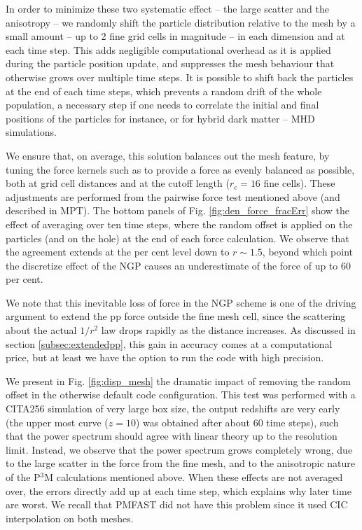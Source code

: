 \documentclass[useAMS,usenatbib]{mn2e}
\begin{document}
In order to minimize these two systematic effect -- the large scatter and the anisotropy -- 
we randomly shift the particle distribution relative to the mesh by a small
amount -- up to 2 fine grid cells in magnitude -- in each
dimension and at each time step.  This adds negligible computational
overhead as it is applied during the particle position update,
and suppresses the mesh behaviour that otherwise grows over multiple time steps.
It is possible to shift back the particles at the end of each time steps,
which prevents a random drift of the whole population, a necessary step 
if one needs to correlate the initial and final positions of the particles for instance,
or for hybrid dark matter -- MHD simulations.
 
We ensure that, on average, this solution balances out the mesh feature,
by tuning the force kernels such as to provide a force as evenly balanced as possible, both at grid cell distances
and at the cutoff length ($r_{c}=16$ fine cells).
These adjustments are performed from the pairwise force test mentioned above (and described in MPT).
The bottom panels of Fig. \ref{fig:den_force_fracErr} show the effect of averaging over ten time steps, 
where the random offset is applied on the particles (and on the hole) at the end of each force calculation. 
We observe that the agreement extends at the per cent level down to $r \sim 1.5$, beyond which point
the discretize effect of the NGP causes an underestimate of the force of up to 60 per cent.

We note that this inevitable loss of force in the NGP scheme is one of the driving argument to extend the pp force outside the fine mesh cell,
since the scattering about the actual $1/r^{2}$ law drops rapidly as the distance increases.
As discussed in section \ref{subsec:extendedpp}, this gain in accuracy comes at a computational price,
but at least we have the option to run the code with high precision.

We present in Fig. \ref{fig:disp_mesh} the dramatic impact of removing the random offset in the otherwise default code configuration.
This test was performed with a CITA256 simulation of very large box size,
the output redshifts are very early (the upper most curve ($z=10$) was obtained after
about 60 time steps), such that the power spectrum should agree with linear theory up to the resolution limit.
Instead, we observe that the power spectrum grows completely wrong, due to the large scatter in the force from the fine mesh,
and to the anisotropic nature of the P$^3$M calculations mentioned above.
When these effects are not averaged over, the errors directly add up at each time step,
which explains why later time are worst.
We recall that {\small PMFAST} did not have this problem since it used CIC interpolation on both meshes.  
\end{document}
